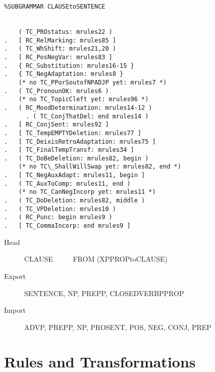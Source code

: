\begin{verbatim}
%SUBGRAMMAR CLAUSEtoSENTENCE


    ( TC_PROstatus: mrules22 )
.   [ RC_RelMarking: mrules85 ]
.   ( TC_WhShift: mrules21,20 )
.   [ RC_PosNegVar: mrules83 ]
.   { RC_Substitution: mrules16-15 }
.   { TC_NegAdaptation: mrules8 }
    (* no TC_PPorSoutofNPADJP yet: mrules7 *)
.   ( TC_PronounOK: mrules6 )
    (* no TC_TopicCleft yet: mrules96 *)
.   ( RC_MoodDetermination: mrules14-12 )
      . ( TC_ConjThatDel: end mrules14 )
.   [ RC_ConjSent: mrules92 ]
.   [ TC_TempEMPTYDeletion: mrules77 ]
.   [ TC_DeixisRetroAdaptation: mrules75 ]
.   [ TC_FinalTempTransf: mrules34 ]
.   ( TC_DoBeDeletion: mrules82, begin )
    (* no TC\_ShallWillSwap yet: mrules82, end *)
.   [ TC_NegAuxAdapt: mrules11, begin ]
.   ( TC_AuxToComp: mrules11, end )
    (* no TC_CanNegIncorp yet: mrules11 *)
.   ( TC_DoDeletion: mrules82, middle )
.   ( TC_VPDeletion: mrules10 )
.   ( RC_Punc: begin mrules9 )
.   [ TC_CommaIncorp: end mrules9 ]
\end{verbatim}

\begin{description}
  \item[Head]     CLAUSE \ \ \ \ \    FROM (XPPROPtoCLAUSE)
  \item[Export] SENTENCE, NP, PREPP, CLOSEDVERBPPROP
  \item[Import] ADVP, PREPP, NP, PROSENT, POS, NEG, CONJ, PREP 
\end{description}


\newpage
\section{Rules and Transformations}

